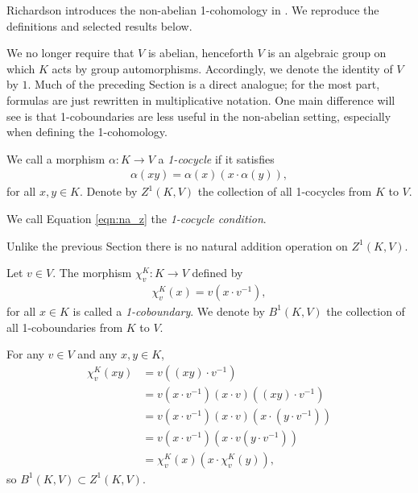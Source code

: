 Richardson introduces the non-abelian 1-cohomology in \cite{richardson1982orbits}. We reproduce the definitions and selected results below.

We no longer require that $V$ is abelian, henceforth $V$ is an algebraic group on which $K$ acts by group automorphisms. Accordingly, we denote the identity of $V$ by $1$. Much of the preceding Section is a direct analogue; for the most part, formulas are just rewritten in multiplicative notation.
One main difference will see is that 1-coboundaries are less useful in the non-abelian setting, especially when defining the 1-cohomology.

\begin{definition} We call a morphism $\alpha:K\rightarrow V$ a \emph{1-cocycle} if it satisfies
\begin{align}
  \alpha(xy) = \alpha(x) (x\cdot\alpha(y)),
  \label{eqn:na_z}
\end{align}
for all $x, y \in K$. Denote by $Z^1\left( K, V \right)$ the collection of all 1-cocycles from $K$ to $V$.

We call Equation \ref{eqn:na_z} the \emph{1-cocycle condition}.
\end{definition}

\begin{remark} Unlike the previous Section there is no natural addition operation on $Z^1(K, V)$.
\end{remark}

\begin{definition} Let $v \in V$. The morphism $\chi^K_v:K\rightarrow V$ defined by
\begin{align*}
	\chi^K_v (x) = v (x\cdot v^{-1}),
\end{align*}
for all $x \in K$ is called a \emph{1-coboundary}. We denote by $B^1\left(K, V\right)$ the collection of all 1-coboundaries from $K$ to $V$.
\end{definition}

For any $v \in V$ and any $x, y \in K$,
\begin{align*}
	\chi^K_v(xy) &=  v \left((xy) \cdot v^{-1}\right) \\
	&=  v (x \cdot v^{-1}) (x \cdot v) ((xy) \cdot v^{-1}) \\
	&=  v \left(x \cdot v^{-1}\right) (x \cdot v) \left(x \cdot \left(y \cdot v^{-1}\right)\right) \\
	&=  v \left(x \cdot v^{-1}\right) \left(x \cdot v \left(y \cdot v^{-1}\right)\right) \\
	&=  \chi^K_v(x) (x \cdot \chi^K_v(y)),
\end{align*}
so $B^1(K, V) \subset Z^1(K, V)$.

